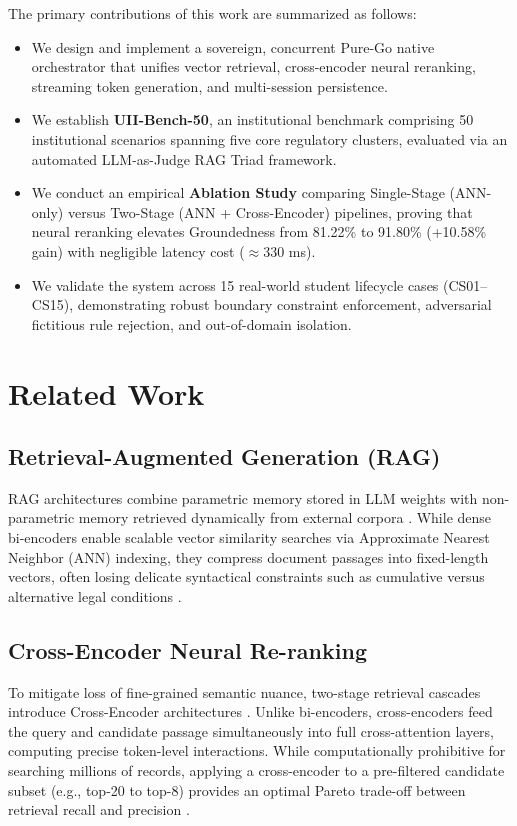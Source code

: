 \documentclass[conference]{IEEEtran}
\begin{document}
The primary contributions of this work are summarized as follows:
\begin{itemize}
    \item We design and implement a sovereign, concurrent Pure-Go native orchestrator that unifies vector retrieval, cross-encoder neural reranking, streaming token generation, and multi-session persistence.
    \item We establish \textbf{UII-Bench-50}, an institutional benchmark comprising 50 institutional scenarios spanning five core regulatory clusters, evaluated via an automated LLM-as-Judge RAG Triad framework.
    \item We conduct an empirical \textbf{Ablation Study} comparing Single-Stage (ANN-only) versus Two-Stage (ANN + Cross-Encoder) pipelines, proving that neural reranking elevates Groundedness from 81.22\% to 91.80\% (+10.58\% gain) with negligible latency cost ($\approx$330 ms).
    \item We validate the system across 15 real-world student lifecycle cases (CS01–CS15), demonstrating robust boundary constraint enforcement, adversarial fictitious rule rejection, and out-of-domain isolation.
\end{itemize}

\section{Related Work}

\subsection{Retrieval-Augmented Generation (RAG)}
RAG architectures combine parametric memory stored in LLM weights with non-parametric memory retrieved dynamically from external corpora \cite{lewis2020retrieval, karpukhin2020dense}. While dense bi-encoders enable scalable vector similarity searches via Approximate Nearest Neighbor (ANN) indexing, they compress document passages into fixed-length vectors, often losing delicate syntactical constraints such as cumulative versus alternative legal conditions \cite{reimers2019sentence}.

\subsection{Cross-Encoder Neural Re-ranking}
To mitigate loss of fine-grained semantic nuance, two-stage retrieval cascades introduce Cross-Encoder architectures \cite{nogueira2019passage}. Unlike bi-encoders, cross-encoders feed the query and candidate passage simultaneously into full cross-attention layers, computing precise token-level interactions. While computationally prohibitive for searching millions of records, applying a cross-encoder to a pre-filtered candidate subset (e.g., top-20 to top-8) provides an optimal Pareto trade-off between retrieval recall and precision \cite{gao2023retrieval}.
\end{document}
